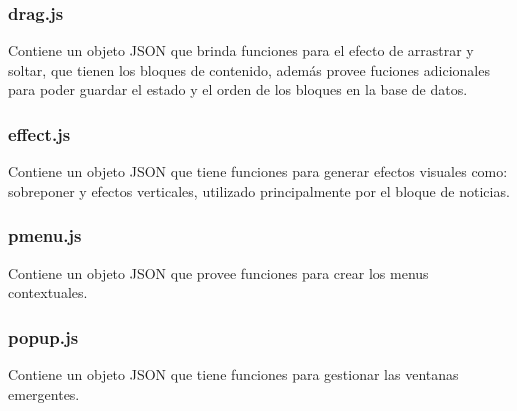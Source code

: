 \subsubsection{drag.js}
Contiene un objeto JSON que brinda funciones para el efecto de arrastrar y soltar, que tienen los bloques de contenido, adem\'as provee fuciones adicionales para poder guardar el estado y el orden de los bloques en la base de datos.

\subsubsection{effect.js}
Contiene un objeto JSON que tiene funciones para generar efectos visuales como: sobreponer y efectos verticales, utilizado principalmente por el bloque de noticias.

\subsubsection{pmenu.js}
Contiene un objeto JSON que provee funciones para crear los menus contextuales.

\subsubsection{popup.js}
Contiene un objeto JSON que tiene funciones para gestionar las ventanas emergentes.

\clearpage
